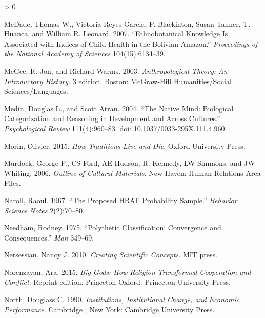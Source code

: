 \documentclass[
  11pt,
]{article}
\newlength{\cslhangindent}
\newenvironment{CSLReferences}[2] %
 {%
  \setlength{\parindent}{0pt}
  \ifodd #1 \everypar{\setlength{\hangindent}{\cslhangindent}}\ignorespaces\fi
  \ifnum #2 > 0
  \setlength{\parskip}{#2\baselineskip}
  \fi
 }%
 {}
\begin{document}
\begin{CSLReferences}{1}{0}
\leavevmode\hypertarget{ref-mcdade2007ethnobotanical}{}%
McDade, Thomas W., Victoria Reyes-Garcia, P. Blackinton, Susan Tanner, T. Huanca, and William R. Leonard. 2007. {``Ethnobotanical Knowledge Is Associated with Indices of Child Health in the Bolivian Amazon.''} \emph{Proceedings of the National Academy of Sciences} 104(15):6134--39.

\leavevmode\hypertarget{ref-mcgeeAnthropologicalTheoryIntroductory2003}{}%
McGee, R. Jon, and Richard Warms. 2003. \emph{Anthropological {Theory}: {An Introductory History}}. 3 edition. {Boston}: {McGraw-Hill Humanities/Social Sciences/Languages}.

\leavevmode\hypertarget{ref-medinNativeMindBiological2004}{}%
Medin, Douglas L., and Scott Atran. 2004. {``The {Native Mind}: {Biological Categorization} and {Reasoning} in {Development} and {Across Cultures}.''} \emph{Psychological Review} 111(4):960--83. doi: \href{https://doi.org/10.1037/0033-295X.111.4.960}{10.1037/0033-295X.111.4.960}.

\leavevmode\hypertarget{ref-morinHowTraditionsLive2015}{}%
Morin, Olivier. 2015. \emph{How {Traditions Live} and {Die}}. {Oxford University Press}.

\leavevmode\hypertarget{ref-murdockOutlineCulturalMaterials2006}{}%
Murdock, George P., CS Ford, AE Hudson, R. Kennedy, LW Simmons, and JW Whiting. 2006. \emph{Outline of {Cultural Materials}}. {New Haven}: {Human Relations Area Files}.

\leavevmode\hypertarget{ref-narollProposedHRAFProbability1967}{}%
Naroll, Raoul. 1967. {``The Proposed {HRAF} Probability Sample.''} \emph{Behavior Science Notes} 2(2):70--80.

\leavevmode\hypertarget{ref-needham1975polythetic}{}%
Needham, Rodney. 1975. {``Polythetic Classification: Convergence and Consequences.''} \emph{Man} 349--69.

\leavevmode\hypertarget{ref-nersessianCreatingScientificConcepts2010}{}%
Nersessian, Nancy J. 2010. \emph{Creating Scientific Concepts}. {MIT press}.

\leavevmode\hypertarget{ref-norenzayanBigGodsHow2015}{}%
Norenzayan, Ara. 2015. \emph{Big {Gods}: {How Religion Transformed Cooperation} and {Conflict}}. Reprint edition. {Princeton Oxford}: {Princeton University Press}.

\leavevmode\hypertarget{ref-northInstitutionsInstitutionalChange1990}{}%
North, Douglass C. 1990. \emph{Institutions, Institutional Change, and Economic Performance}. {Cambridge ; New York}: {Cambridge University Press}.


\end{CSLReferences}
\end{document}
